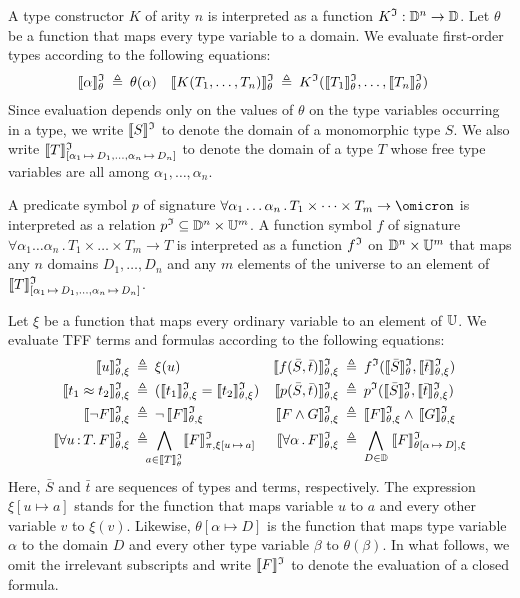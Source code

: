 \newcommand{\eval}[1]{\llbracket#1\rrbracket^\cI_{\theta,\xi}}
\newcommand{\evalT}[1]{\llbracket#1\rrbracket^\cI_{\theta}}
\newcommand{\evalG}[1]{\llbracket#1\rrbracket^\cI}
A type constructor $K$ of arity $n$ is interpreted as a function
$K^{\mathfrak{I}} : \mathbb{D}^n \to \mathbb{D}$.
Let $\theta$ be a function that maps every type variable to
a domain. We evaluate first-order types according to the
following equations:
\begin{align*}
\evalT{\alpha} &\eqdef \theta(\alpha) &
\evalT{K(T_1,\dots,T_n)} &\eqdef K^{\cI}(\evalT{T_1},\dots,\evalT{T_n})
\end{align*}
Since evaluation depends only on the values of $\theta$
on the type variables occurring in a type, we write $\evalG{S}$
to denote the domain of a monomorphic type $S$. We also write
$\evalG{T}_{[\alpha_1\,\mapsto\,D_1,\dots,\alpha_n\,\mapsto\,D_n]}$
to denote the domain of a type $T$ whose free type variables
are all among $\alpha_1,\dots,\alpha_n$.

A predicate symbol $p$ of signature
$\forall \alpha_1\dots\alpha_n \,.\, T_1 \times \dots \times T_m
\to \omicron$ is interpreted as a relation
$p^{\mathfrak{I}} \subseteq \mathbb{D}^n \times \mathbb{U}^m$.
A function symbol $f$ of signature
$\forall \alpha_1\dots\alpha_n \,.\, T_1 \times \dots \times T_m \to T$
is interpreted as a function
$f^{\mathfrak{I}}$ on $\mathbb{D}^n \times \mathbb{U}^m$ that
maps any $n$ domains $D_1,\dots,D_n$ and
any $m$ elements of the universe
to an element of
$\evalG{T}_{[\alpha_1\,\mapsto\,D_1,\dots,\alpha_n\,\mapsto\,D_n]}$.

Let $\xi$ be a function that maps every ordinary variable
to an element of $\mathbb{U}$. We evaluate TFF terms and formulas
according to the following equations:
\begin{align*}
\eval{u} &\eqdef \xi(u) &
\eval{f(\bar{S},\bar{t})} &\eqdef f^\cI(\evalT{\bar{S}},\eval{\bar{t}}) \\
\eval{t_1 \approx t_2} &\eqdef (\eval{t_1} = \eval{t_2}) &
\eval{p(\bar{S},\bar{t})} &\eqdef p^\cI(\evalT{\bar{S}},\eval{\bar{t}}) \\
\eval{\lnot F} &\eqdef \lnot\, \eval{F} &
\eval{F \land G} &\eqdef \eval{F} \land\, \eval{G} \\
\eval{\forall u \ty T .\, F} &\eqdef \!\!\!\!
\bigwedge_{a \in \evalT{T}}
\llbracket F \rrbracket^\cI_{\pi,\xi[u\,\mapsto\,a]} &
\eval{\forall \alpha \,.\, F} &\eqdef
\bigwedge_{D \in \sorts}\;
\llbracket F \rrbracket^\cI_{\theta[\alpha\,\mapsto\,D],\xi}
\end{align*}
Here, $\bar{S}$ and $\bar{t}$ are sequences of types
and terms, respectively. The expression $\xi[u \mapsto a]$
stands for the function that maps
variable $u$ to $a$ and every other variable $v$ to $\xi(v)$.
Likewise, $\theta[\alpha \mapsto D]$ is the function that maps
type variable $\alpha$ to the domain $D$ and every other type
variable $\beta$ to $\theta(\beta)$. In what follows,
we omit the irrelevant subscripts and write $\evalG{F}$
to denote the evaluation of a closed formula.

